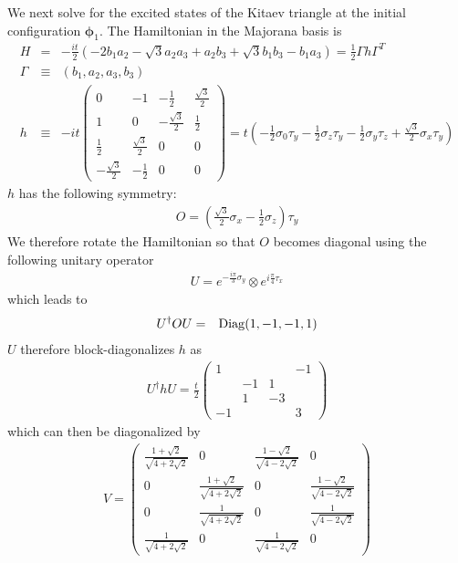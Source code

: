 \documentclass[aps,prb,showpacs,amsmath,amssymb,superscriptaddress]{revtex4-2}
\begin{document}
We next solve for the excited states of the Kitaev triangle at the initial configuration $\boldsymbol{\phi}_1$. The Hamiltonian in the Majorana basis is
\begin{eqnarray}
	H &=& -\frac{it}{2}\left( -2b_1 a_2 - \sqrt{3} a_2 a_3 + a_2 b_3 + \sqrt{3} b_1 b_3 - b_1 a_3   \right) = \frac{1}{2}\Gamma h\Gamma^T\\\nonumber
 \Gamma &\equiv& (b_1, a_2, a_3, b_3)\\\nonumber
h&\equiv&-it\begin{pmatrix}
	0 & -1 & -\frac{1}{2} & \frac{\sqrt{3}}{2} \\
	1 & 0 & -\frac{\sqrt{3}}{2} & \frac{1}{2}\\
	\frac{1}{2} & \frac{\sqrt{3}}{2} & 0 & 0 \\
	-\frac{\sqrt{3}}{2} & -\frac{1}{2} & 0 & 0
\end{pmatrix} = t\left( -\frac{1}{2}\sigma_0 \tau_y - \frac{1}{2}\sigma_z\tau_y -\frac{1}{2}\sigma_y \tau_z + \frac{\sqrt{3}}{2} \sigma_x \tau_y \right)
\end{eqnarray}
$h$ has the following symmetry:
\begin{eqnarray}
	O = \left(\frac{\sqrt{3}}{2}\sigma_x - \frac{1}{2}\sigma_z\right) \tau_y
\end{eqnarray}
We therefore rotate the Hamiltonian so that $O$ becomes diagonal using the following unitary operator
\begin{eqnarray}
	U = e^{-\frac{i\pi}{3}\sigma_y}\otimes e^{i\frac{\pi}{4}\tau_x}
\end{eqnarray}
which leads to
\begin{eqnarray}
	U^\dag O U &=& {\rm Diag}(1,-1,-1,1)
\end{eqnarray}
$U$ therefore block-diagonalizes $h$ as
\begin{eqnarray}
	U^\dag h U = 	\frac{t}{2}\begin{pmatrix}
		1 &  &  & -1 \\
		& -1 & 1 & \\
		& 1 & -3 & \\
		-1 & & & 3
	\end{pmatrix}
\end{eqnarray}
which can then be diagonalized by
\begin{eqnarray}
	V = \begin{pmatrix}
		\frac{1+ \sqrt{2}}{\sqrt{4+2\sqrt{2}}} & 0 & \frac{1 - \sqrt{2}}{\sqrt{4-2\sqrt{2}}} & 0 \\
		0 & \frac{1 + \sqrt{2}}{\sqrt{4 + 2\sqrt{2}}} & 0 & \frac{1-\sqrt{2}}{\sqrt{4 - 2\sqrt{2}}} \\
		0 & \frac{1}{\sqrt{4+ 2\sqrt{2}}} & 0 & \frac{1}{\sqrt{4 - 2\sqrt{2}}} \\
		\frac{1}{\sqrt{4+2\sqrt{2}}} & 0 & \frac{1}{\sqrt{4-2\sqrt{2}}} & 0
	\end{pmatrix}
\end{eqnarray}
\end{document}
